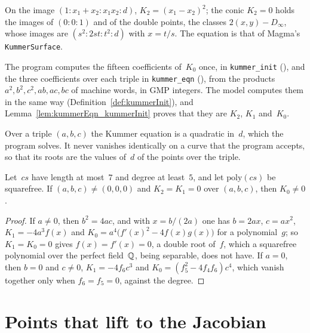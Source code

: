 On the image $(1 : x_1 + x_2 : x_1 x_2 : d)$, $K_2 = (x_1 - x_2)^2$; the conic $K_2 = 0$ holds the
images of $(0 : 0 : 1)$ and of the double points, the classes $2 (x, y) - D_\infty$, whose images
are $(s^2 : 2st : t^2 : d)$ with $x = t/s$. The equation is that of Magma's \verb|KummerSurface|.

\begin{remark}\label{rem:specKummerC}
  The program computes the fifteen coefficients of~$K_0$ once, in \texttt{kummer\_init}
  (), and the three coefficients over each triple in
  \texttt{kummer\_eqn} (), from the products $a^2, b^2, c^2, ab,
  ac, bc$ of machine words, in GMP integers. The model computes them in the same way
  (Definition~\ref{def:kummerInit}), and Lemma~\ref{lem:kummerEqn_kummerInit} proves that they are
  $K_2$, $K_1$ and~$K_0$.
\end{remark}

Over a triple $(a, b, c)$ the Kummer equation is a quadratic in~$d$, which the program solves. It
never vanishes identically on a curve that the program accepts, so that its roots are the values
of~$d$ of the points over the triple.

\begin{lemma}\label{lem:kummerK0_ne_zero}
  \leanok
  Let~$cs$ have length at most~$7$ and degree at least~$5$, and let $\mathrm{poly}(cs)$ be
  squarefree. If $(a, b, c) \ne (0, 0, 0)$ and $K_2 = K_1 = 0$ over $(a, b, c)$, then $K_0 \ne 0$.
\end{lemma}

\begin{proof}\leanok
  If $a \ne 0$, then $b^2 = 4ac$, and with $x = b/(2a)$ one has $b = 2ax$, $c = ax^2$,
  $K_1 = -4a^3 f(x)$ and $K_0 = a^4 \bigl(f'(x)^2 - 4 f(x) g(x)\bigr)$ for a polynomial~$g$; so
  $K_1 = K_0 = 0$ gives $f(x) = f'(x) = 0$, a double root of~$f$, which a squarefree polynomial
  over the perfect field~$\mathbb{Q}$, being separable, does not have. If $a = 0$, then $b = 0$ and
  $c \ne 0$, $K_1 = -4 f_6 c^3$ and $K_0 = (f_5^2 - 4 f_4 f_6) c^4$, which vanish together only
  when $f_6 = f_5 = 0$, against the degree.
\end{proof}

\section{Points that lift to the Jacobian}\label{sec:specLifts}

